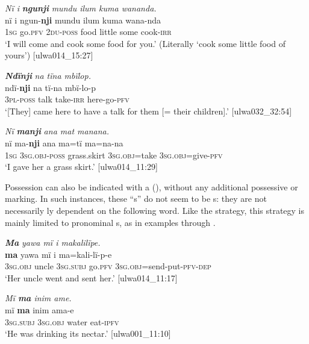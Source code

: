 \ea%
    \label{ex:phrase:21}
          \textit{Nï i} \textbf{\textit{ngunji}} \textit{mundu ilum kuma wananda.}\\
\gll    nï    i    ngun-\textbf{nji}  mundu  ilum  kuma  wana-nda\\
    1\textsc{sg}  go.\textsc{pfv}  \textsc{2du-poss}  food  little  some  cook-\textsc{irr}\\
\glt `I will come and cook some food for you.’ (Literally ‘cook some little food of yours’) [ulwa014\_15:27]
\z

\ea%
    \label{ex:phrase:22}
          \textbf{\textit{Ndïnji}} \textit{na tïna mbïlop.}\\
\gll    ndï-\textbf{nji}    na    tï-na    mbï-lo-p\\
    3\textsc{pl-poss}  talk  take-\textsc{irr}  here-go-\textsc{pfv}\\
\glt `[They] came here to have a talk for them [= their children].’ [ulwa032\_32:54]
\z

\ea%
    \label{ex:phrase:23}
          \textit{Nï} \textbf{\textit{manji}} \textit{ana mat manana.}\\
\gll    nï    ma-\textbf{nji}      ana      ma=tï      ma=na-na\\
    1\textsc{sg}  3\textsc{sg.obj-poss}  grass.skirt  3\textsc{sg.obj}=take  3\textsc{sg.obj}=give-\textsc{pfv}\\
\glt `I gave her a grass skirt.’ [ulwa014\_11:29]
\z

Possession can also be indicated with a  (), without any additional possessive or  marking. In such instances, these “s” do not seem to be s: they are not necessarily ly dependent on the following word. Like the  strategy, this strategy is mainly limited to pronominal s, as in examples  through .

\ea%
    \label{ex:phrase:24}
          \textbf{\textit{Ma}} \textit{yawa mï i makalilïpe.}\\
\gll    \textbf{ma}      yawa  mï      i    ma=kali-lï-p-e\\
    3\textsc{sg.obj}  uncle  \textsc{3sg.subj}  go.\textsc{pfv}  \textsc{3sg.obj}=send-put-\textsc{pfv-dep}\\
\glt `Her uncle went and sent her.’ [ulwa014\_11:17]
\z

\ea%
    \label{ex:phrase:25}
          \textit{Mï \textbf{ma} inim ame.}\\
\gll    mï      \textbf{ma}      inim  ama-e\\
    3\textsc{sg.subj}  \textsc{3sg.obj}  water  eat-\textsc{ipfv}\\
\glt `He was drinking its nectar.’ [ulwa001\_11:10]
\z

